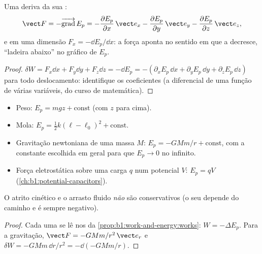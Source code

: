 \begin{proposition}\label{prop:b1:work-and-energy:gradient}
Uma  deriva da sua :
\[
\vect F = -\overrightarrow{\operatorname{grad}}\,E_p
= -\frac{\partial E_p}{\partial x}\,\vect e_x
- \frac{\partial E_p}{\partial y}\,\vect e_y
- \frac{\partial E_p}{\partial z}\,\vect e_z ,
\]
e em uma dimensão $F_x = -\dd E_p/\dd x$: a força aponta no sentido em que a
 decresce, ``ladeira abaixo'' no gráfico de $E_p$.
\end{proposition}

\begin{proof}
$\delta W = F_x\dd x + F_y\dd y + F_z\dd z = -\dd E_p = -(\partial_xE_p\,\dd x
+ \partial_yE_p\,\dd y + \partial_zE_p\,\dd z)$ para todo deslocamento:
identifique os coeficientes (a diferencial de uma função de várias
variáveis, do curso de matemática).
\end{proof}

\begin{proposition}\label{prop:b1:work-and-energy:eps}
\begin{itemize}
  \item Peso: $E_p = mgz + \text{const}$ (com $z$ para cima).
  \item Mola: $E_p = \tfrac12 k(\ell - \ell_0)^2 + \text{const}$.
  \item Gravitação newtoniana de uma massa $M$: $E_p = -GMm/r + \text{const}$,
        com a constante escolhida em geral para que $E_p \to 0$ no infinito.
  \item Força eletrostática sobre uma carga $q$ num potencial $V$:
        $E_p = qV$ (\cref{ch:b1:potential-capacitors}).
\end{itemize}
O atrito cinético e o arrasto fluido \emph{não} são conservativos (o seu 
depende do caminho e é sempre negativo).
\end{proposition}

\begin{proof}
Cada uma se lê nos  da \cref{prop:b1:work-and-energy:works}:
$W = -\Delta E_p$. Para a gravitação, $\vect F = -GMm/r^2\,\vect e_r$ e
$\delta W = -GMm\,\dd r/r^2 = -\dd(-GMm/r)$.
\end{proof}

